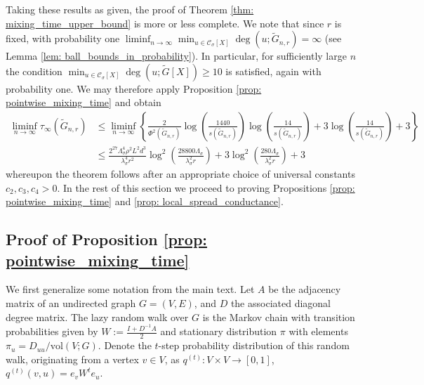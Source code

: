 \documentclass[11pt,twoside]{article}
\newcommand{\vol}{\mathrm{vol}}
\newcommand{\1}{\mathbf{1}}
\newcommand{\Abf}{A}
\newcommand{\Xbf}{X}             %
\newcommand{\Wbf}{W}
\newcommand{\Dbf}{D}
\newcommand{\Ibf}[1]{I_{#1}}
\newcommand{\Cset}{\mathcal{C}}
\newcommand{\Csig}{\Cset_{\sigma}}
\begin{document}
Taking these results as given, the proof of Theorem \ref{thm: mixing_time_upper_bound} is more or less complete. We note that since $r$ is fixed, with probability one $\liminf_{n \to \infty} \min_{u \in \Csig[\Xbf]} \deg(u; \widetilde{G}_{n,r}) = \infty$ (see Lemma \ref{lem: ball_bounds_in_probability}). In particular, for sufficiently large $n$ the condition $\min_{u \in \Csig[\Xbf]} \deg(u; \widetilde{G}[\Xbf]) \geq 10$ is satisfied, again with probability one. We may therefore apply Proposition \ref{prop: pointwise_mixing_time} and obtain
\begin{align*}
\liminf_{n \to \infty} \tau_{\infty}(\widetilde{G}_{n,r}) & \leq \liminf_{n \to \infty} \left\{\frac{2}{\Phi^2(\widetilde{G}_{n,r})} \log \left(\frac{1440}{s(\widetilde{G}_{n,r})}\right)\log \left(\frac{14}{s(\widetilde{G}_{n,r})}\right)  + 3 \log \left(\frac{14}{s(\widetilde{G}_{n,r})}\right) + 3 \right\}
\\
& \leq \frac{2^{27}\Lambda_{\sigma}^4\rho^2L^2 d^3}{\lambda_{\sigma}^4 r^2} \log^2\left(\frac{28800\Lambda_{\sigma}}{\lambda_{\sigma}^2 r}\right) + 3 \log^2\left(\frac{280\Lambda_{\sigma}}{\lambda_{\sigma}^2 r}\right) + 3
\end{align*}
whereupon the theorem follows after an appropriate choice of universal constants $c_2, c_3, c_4 > 0$. In the rest of this section we proceed to proving Propositions \ref{prop: pointwise_mixing_time} and \ref{prop: local_spread_conductance}.

\subsection{Proof of Proposition \ref{prop: pointwise_mixing_time}}
\label{sec: pointwise_mixing_time}

We first generalize some notation from the main text. Let $A$ be the adjacency matrix of an undirected graph $G = (V,E)$, and $D$ the associated diagonal degree matrix. The lazy random walk over $G$ is the Markov chain with transition probabilities given by $\Wbf := \frac{\Ibf{} + \Dbf^{-1} \Abf}{2}$ and stationary distribution $\pi$ with elements $\pi_u = D_{uu}/\vol(V;G)$.  Denote the $t$-step probability distribution of this random walk, originating from a  vertex $v \in V$, as $q^{(t)}: V \times V \to [0,1]$, $q^{(t)}(v,u) = e_v \Wbf^t e_u$.
\end{document}
